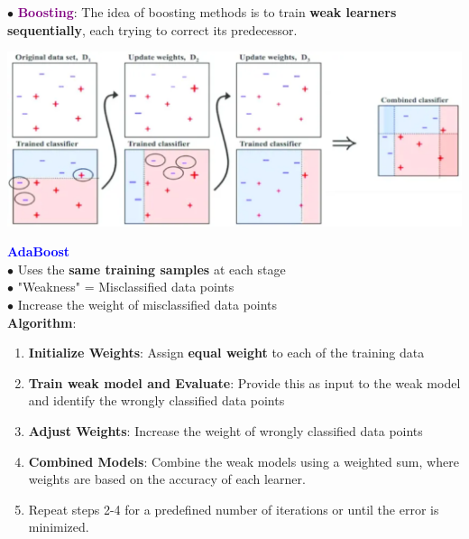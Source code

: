 \documentclass[letterpaper, 10.5pt,landscape]{article}
\begin{document}
\begin{multicols*}{3}
\vspace{7pt}
$\bullet$ \textbf{\textcolor{purple}{Boosting}}: The idea of boosting methods is to train \textbf{weak learners sequentially}, each trying to correct its predecessor. \\



\vspace{-5pt}
\begin{center}
    \begin{minipage}{\linewidth}
    \includegraphics[width=\textwidth]{figures/boosting.PNG}
    \end{minipage}
\end{center}
\vspace{-5pt}



\vspace{3pt}
\textcolor{blue}{\textbf{AdaBoost}} \\

$\bullet$ Uses the \textbf{same training samples} at each stage \\
$\bullet$ "Weakness" =  Misclassified data points \\
$\bullet$ Increase the weight of misclassified data points \\
\textbf{Algorithm}:
\vspace{-3pt}
\begin{enumerate}
    \item \textbf{Initialize Weights}: Assign \textbf{equal weight} to each of the training data 
    \vspace{-3pt}
    \item \textbf{Train weak model and Evaluate}: Provide this as input to the weak model and identify the wrongly classified data points
    \vspace{-3pt}
    \item \textbf{Adjust Weights}: Increase the weight of wrongly classified data points
      \vspace{-3pt}
    \item \textbf{Combined Models}: Combine the weak models using a weighted sum, where weights are based on the accuracy of each learner.
    \vspace{-3pt}
    \item Repeat steps 2-4 for a predefined number of iterations or until the error is minimized.
\end{enumerate}





\end{multicols*}
\end{document}
